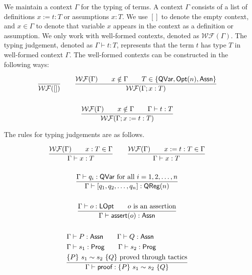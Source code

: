 \newcommand{\WF}[1]{\ensuremath{\mathcal{WF}(#1)}}

We maintain a context $\Gamma$ for the typing of terms. A context $\Gamma$ consists of a list of definitions $x := t : T$ or assumptions $x : T$. 
We use $[]$ to denote the empty context, and $x \in \Gamma$ to denote that variable $x$ appears in the context as a definition or assumption.
We only work with well-formed contexts, denoted as \WF{\Gamma}. The typing judgement, denoted as $\Gamma \vdash t : T$, represents that the term $t$ has type $T$ in well-formed context $\Gamma$. The well-formed contexts can be constructed in the following ways:

\begin{gather*}
    \frac{}{\WF{[]}} 
    \qquad 
    \frac{\WF{\Gamma} \qquad x \notin \Gamma \qquad T \in \{\qvar, \opt{n}, \assn \}}{\WF{\Gamma;x:T}} \\
    \\
    \frac{\WF{\Gamma} \qquad x \notin \Gamma \qquad \Gamma \vdash t : T}{\WF{\Gamma;x := t : T}} 
\end{gather*}

The rules for typing judgements are as follows.

\begin{gather*}
    \frac{\WF{\Gamma} \qquad x : T \in \Gamma}{\Gamma \vdash x : T}
    \qquad
    \frac{\WF{\Gamma} \qquad x := t : T \in \Gamma}{\Gamma \vdash x : T} \\
    \\
    \frac{\Gamma \vdash q_i : \qvar \text{ for all } i = 1, 2, \dots, n}{\Gamma \vdash [q_1, q_2, \dots, q_n] : \qreg{n}} \\
    \\
    \frac{\Gamma \vdash o : \lopt \qquad \text{$o$ is an assertion}}{\Gamma \vdash \assert{o} : \assn} \\
    \\
    \frac{
        \begin{aligned}
            & \Gamma \vdash P : \assn \qquad \Gamma \vdash Q : \assn  \\
            & \Gamma \vdash s_1 : \prog \qquad \Gamma \vdash s_2 : \prog \\
            & \judge{P}{s_1}{s_2}{Q} \text{ proved through tactics}
        \end{aligned}}
        {
            \Gamma \vdash \pf : \judge{P}{s_1}{s_2}{Q}
        }
\end{gather*}


